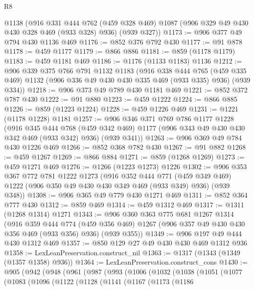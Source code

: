 \begin{lexlean}{R8}
\begin{coremodule}
    @1138
    (@916
      @331
      @444
      @762
      (@459 @328 @469)
      @1087
      (@906 @329 @49 @430 @430 @328 @469 (@933 @328) @936)
      (@939 @327))
@1173 := @906 @377 @49 @794 @430 @1136 @469
@1176 := @852 @376 @792 @430
@1177 := @91 @878
@1178 := @459 @1177
@1179 := @866 @886
@1181 := @859 (@1178 @1179)
@1183 := @459 @1181 @469
@1186 := @1176 (@1133 @1183) @1136
@1212 := @906
    @339
    @375
    @766
    @791
    @1132
    @1183
    (@916
      @338
      @444
      @765
      (@459 @335 @469)
      @1132
      (@906 @336 @49 @430 @430 @335 @469 (@933 @335) @936)
      (@939 @334))
@1218 := @906 @373 @49 @789 @430 @1181 @469
@1221 := @852 @372 @787 @430
@1222 := @91 @880
@1223 := @459 @1222
@1224 := @866 @885
@1226 := @859 (@1223 @1224)
@1228 := @459 @1226 @469
@1231 := @1221 (@1178 @1228) @1181
@1257 := @906
    @346
    @371
    @769
    @786
    @1177
    @1228
    (@916
      @345
      @444
      @768
      (@459 @342 @469)
      @1177
      (@906 @343 @49 @430 @430 @342 @469 (@933 @342) @936)
      (@939 @341))
@1263 := @906 @369 @49 @784 @430 @1226 @469
@1266 := @852 @368 @782 @430
@1267 := @91 @882
@1268 := @459 @1267
@1269 := @866 @884
@1271 := @859 (@1268 @1269)
@1273 := @459 @1271 @469
@1276 := @1266 (@1223 @1273) @1226
@1302 := @906
    @353
    @367
    @772
    @781
    @1222
    @1273
    (@916
      @352
      @444
      @771
      (@459 @349 @469)
      @1222
      (@906 @350 @49 @430 @430 @349 @469 (@933 @349) @936)
      (@939 @348))
@1308 := @906 @365 @49 @779 @430 @1271 @469
@1311 := @852 @364 @777 @430
@1312 := @859 @469
@1314 := @459 @1312 @469
@1317 := @1311 (@1268 @1314) @1271
@1343 := @906
    @360
    @363
    @775
    @681
    @1267
    @1314
    (@916
      @359
      @444
      @774
      (@459 @356 @469)
      @1267
      (@906 @357 @49 @430 @430 @356 @469 (@933 @356) @936)
      (@939 @355))
@1349 := @906 @197 @49 @444 @430 @1312 @469
@1357 := @850 @129 @27 @49 @430 @430 @469 @1312 @936
@1358 := LexLeanPreservation.construct_nil
@1363 := @1317 (@1343 (@1349 (@1357 @1358) @936))
@1364 := LexLeanPreservation.construct_cons
@1430 := @905
    (@942
      (@948
        (@961
          (@987
            (@993
              (@1006
                (@1032
                  (@1038
                    (@1051
                      (@1077
                        (@1083
                          (@1096
                            (@1122
                              (@1128
                                (@1141
                                  (@1167
                                    (@1173
                                      (@1186

\end{coremodule}
\end{lexlean}
